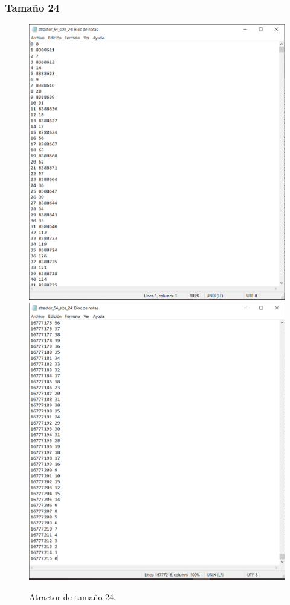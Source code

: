 \documentclass[11pt]{article}
\begin{document}
			\subsubsection{Tamaño 24}
			\begin{figure}[H]
			\centering
			\includegraphics[scale=0.3]{resources/Atractores54/atractor_54_size_24.png}
			\includegraphics[scale=0.3]{resources/Atractores54/atractor_54_size_241.png}
			\caption{Atractor de tamaño 24.}\label{fig:picture}
			\end{figure}
\end{document}
